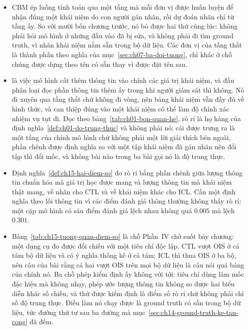 \begin{tomtat}
\begin{itemize}
  \item CBM ép luồng tính toán qua một tầng mà mỗi đơn vị được huấn luyện để
nhận đúng một khái niệm do con người gán nhãn, rồi dự đoán nhãn chỉ từ tầng ấy.
So với mười bốn chương trước, nó bỏ được hai thứ cùng lúc: không phải hỏi mô
hình ở những đầu vào đã bị sửa, và không phải đi tìm ground truth, vì nhãn khái
niệm nằm sẵn trong bộ dữ liệu. Các đơn vị của tầng thắt là thành phần theo nghĩa
của mục~\ref{sec:ch07-ba-doi-tuong}, chỉ khác ở chỗ chúng được dựng theo tên có
sẵn thay vì được đặt tên sau.
  \item {} là việc mô hình cất thêm thông tin vào chính các giá
trị khái niệm, và đầu phân loại đọc phần thông tin thêm ấy trong khi người giám
sát thì không. Nó đi xuyên qua tầng thắt chứ không đi vòng, nên bảng khái niệm
vẫn đầy đủ về hình thức, và can thiệp đúng vào một khái niệm có thể làm độ chính
xác nhiệm vụ tụt đi. Đọc theo bảng~\ref{tab:ch01-bon-quan-he}, rò rỉ là họ hàng
của định nghĩa~\ref{def:ch01-do-trung-thuc} và không phải nó: cái được trưng ra
là một tầng của chính mô hình chứ không phải một lời giải thích bên ngoài, phần
chênh được định nghĩa so với một tập khái niệm đã gán nhãn nên đổi tập thì đổi
mốc, và không bài nào trong ba bài gọi nó là độ trung thực.
  \item Định nghĩa~\ref{def:ch15-hai-diem-so} đo rò rỉ bằng phần chênh giữa
lượng thông tin chuẩn hóa mà giá trị học được mang và lượng thông tin mà khái
niệm thật mang, về nhãn cho CTL và về khái niệm khác cho ICL. Cần một định nghĩa
theo lối thông tin vì các điểm đánh giá thông thường không thấy rò rỉ: một cặp
mô hình có sáu điểm đánh giá lệch nhau không quá $0.005$ mà
 lệch $0.301$.
  \item Bảng~\ref{tab:ch15-tuong-quan-diem-so} là chỗ Phần~IV chờ suốt bảy
chương: một dụng cụ đo được đối chiếu với một tiêu chí độc lập. CTL vượt OIS ở
cả tám bộ dữ liệu và có ý nghĩa thống kê ở cả tám; ICL thì thua OIS ở ba bộ, nên
câu của bài rằng cả hai vượt OIS trên mọi bộ dữ liệu là câu nói quá bảng của
chính nó. Ba chỗ phép kiểm định ấy không với tới: tiêu chí dùng làm mốc đặc hiệu
mà không nhạy, phép ước lượng thông tin không so được hai biểu diễn khác số
chiều, và thứ được kiểm định là điểm số rò rỉ chứ không phải chỉ số độ trung
thực. Điều làm nó chạy được là ground truth có sẵn trong bộ dữ liệu, tức đường
thứ tư sau ba đường mà mục~\ref{sec:ch14-ground-truth-ke-tan-cong} đã đếm.

\end{itemize}
\end{tomtat}
